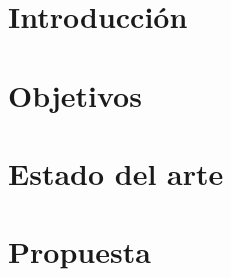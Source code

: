 \documentclass[a4paper,11pt]{report}
\begin{document}
\renewcommand{\contentsname}{Índice}
\renewcommand{\chaptername}{Capítulo}
\renewcommand{\figurename}{Figura}
\renewcommand{\listfigurename}{Índice de figuras}
\renewcommand{\tablename}{Tabla}
\renewcommand{\listtablename}{Índice de tablas}
\renewcommand\bibname{Bibliografía}

\pagestyle{empty}

\pagebreak
\newpage
\thispagestyle{empty}
\mbox{}
\pagestyle{plain}

\tableofcontents

\chapter{Introducción}


\chapter{Objetivos}


\chapter{Estado del arte}


\chapter{Propuesta}


\begin{flushleft}


\end{flushleft}
\end{document}
